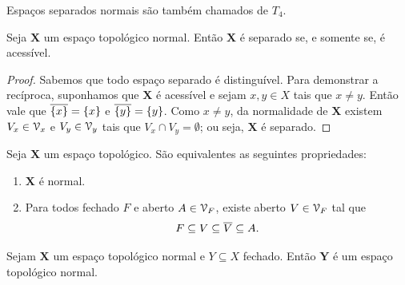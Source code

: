 Espaços separados normais são também chamados de $T_4$.

\begin{prop}
	Seja $\bm X$ um espaço topológico normal. Então $\bm X$ é separado se, e somente se, é acessível.
\end{prop}
\begin{proof}
	Sabemos que todo espaço separado é distinguível. Para demonstrar a recíproca, suponhamos que $\bm X$ é acessível e sejam $x,y \in X$ tais que $x \neq y$. Então vale que $\overline{\{x\}}=\{x\}$ e $\overline{\{y\}}=\{y\}$. Como $x \neq y$, da normalidade de $\bm X$ existem $V_x \in \mathcal{V}_x$ e $V_y \in \mathcal{V}_y$ tais que $V_x \cap V_y = \emptyset$; ou seja, $\bm X$ é separado.
\end{proof}

\begin{prop}
	Seja $\bm X$ um espaço topológico. São equivalentes as seguintes propriedades:
	\begin{enumerate}
	\item $\bm X$ é normal.
	\item Para todos fechado $F$ e aberto $A \in \mathcal{V}_F$, existe aberto $V \in \mathcal{V}_F$ tal que
		\begin{equation*}
		F \subseteq V \subseteq \overline{V} \subseteq A.
		\end{equation*}
	\end{enumerate}
\end{prop}

\begin{prop}
	Sejam $\bm X$ um espaço topológico normal e $Y \subseteq X$ fechado. Então $\bm Y$ é um espaço topológico normal.
\end{prop}


